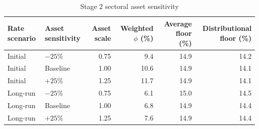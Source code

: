 \begin{table}[H]
\centering
\footnotesize
\setlength{\tabcolsep}{3pt}
\caption{Stage 2 sectoral asset sensitivity}
\label{tab:app_stage2_asset_sensitivity}
\begin{tabular}{@{}llrrrr@{}}
\toprule
Rate scenario & Asset sensitivity & Asset scale & Weighted $\phi$ (\%) & Average floor (\%) & Distributional floor (\%) \\
\midrule
Initial & $-25\%$ & 0.75 &  9.4 & 14.9 & 14.2 \\
Initial & Baseline & 1.00 & 10.6 & 14.9 & 14.1 \\
Initial & $+25\%$ & 1.25 & 11.7 & 14.9 & 14.1 \\
Long-run & $-25\%$ & 0.75 &  6.1 & 15.0 & 14.5 \\
Long-run & Baseline & 1.00 &  6.8 & 14.9 & 14.4 \\
Long-run & $+25\%$ & 1.25 &  7.6 & 14.9 & 14.4 \\
\bottomrule
\end{tabular}
\end{table}
